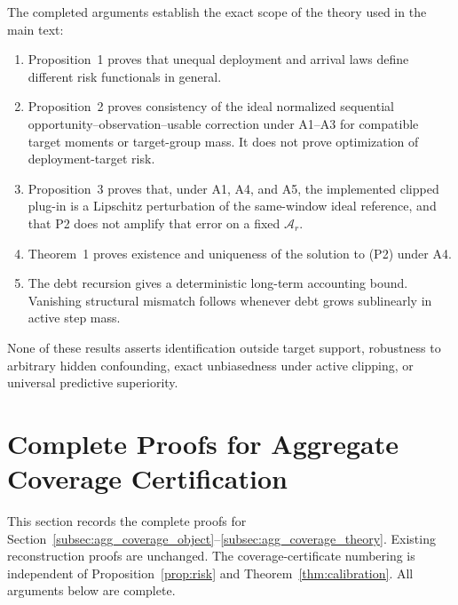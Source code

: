 The completed arguments establish the exact scope of the theory used in
the main text:

\begin{enumerate}
    \item Proposition~1 proves that unequal deployment and arrival laws define
    different risk functionals in general.
    \item Proposition~2 proves consistency of the ideal normalized sequential
    opportunity--observation--usable correction under A1--A3 for compatible
    target moments or target-group mass.  It does not prove optimization of
    deployment-target risk.
    \item Proposition~3 proves that, under A1, A4, and A5, the implemented
    clipped plug-in is a Lipschitz perturbation of the same-window ideal
    reference, and that P2 does not amplify that error on a fixed
    $\mathcal{A}_r$.
    \item Theorem~1 proves existence and uniqueness of the solution to (P2)
    under A4.
    \item The debt recursion gives a deterministic long-term accounting bound.
    Vanishing structural mismatch follows whenever debt grows sublinearly in
    active step mass.
\end{enumerate}

None of these results asserts identification outside target support, robustness
to arbitrary hidden confounding, exact unbiasedness under active clipping, or
universal predictive superiority.


\section{Complete Proofs for Aggregate Coverage Certification}
\label{app:agg_coverage_proofs}

This section records the complete proofs for
Section~\ref{subsec:agg_coverage_object}--\ref{subsec:agg_coverage_theory}.
Existing reconstruction proofs are unchanged.  The coverage-certificate
numbering is independent of Proposition~\ref{prop:risk} and
Theorem~\ref{thm:calibration}.  All arguments below are complete.

